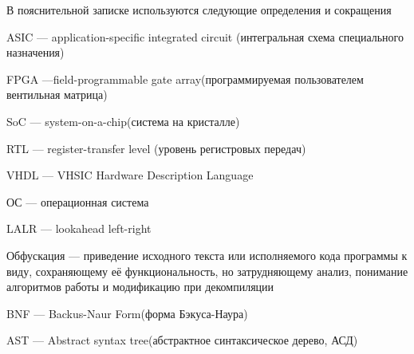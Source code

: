 
В пояснительной записке используются следующие определения и сокращения

ASIC --- application-specific integrated circuit (интегральная схема специального назначения)

FPGA ---field-programmable gate array(программируемая пользователем вентильная матрица)

SoC --- system-on-a-chip(система на кристалле)

RTL --- register-transfer level (уровень регистровых передач)

VHDL --- VHSIC Hardware Description Language

ОС --- операционная система

LALR --- lookahead left-right

Обфускация --- приведение исходного текста или исполняемого кода программы к виду, сохраняющему её функциональность, но затрудняющему анализ, понимание алгоритмов работы и модификацию при декомпиляции

BNF --- Backus-Naur Form(форма Бэкуса-Наура)

AST --- Abstract syntax tree(абстрактное синтаксическое дерево, АСД)